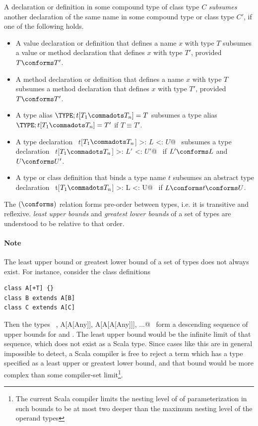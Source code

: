 A declaration or definition in some compound type of class type $C$
{\em subsumes} another
declaration of the same name in some compound type or class type $C'$, if one of the following holds.
\begin{itemize}
\item
A value declaration or definition that defines a name $x$ with type $T$ subsumes 
a value or method declaration that defines $x$ with type $T'$, provided $T \conforms T'$.
\item 
A method declaration or definition that defines a name $x$ with type $T$ subsumes 
a method declaration that defines $x$ with type $T'$, provided $T \conforms T'$.
\item
A type alias
$\TYPE;t[T_1 \commadots T_n]=T$ subsumes a type alias $\TYPE;t[T_1 \commadots T_n]=T'$ if %
$T \equiv T'$. 
\item 
A type declaration ~\lstinline@type $t$[$T_1 \commadots T_n$] >: $L$ <: $U$@~ subsumes %
a type declaration ~\lstinline@type $t$[$T_1 \commadots T_n$] >: $L'$ <: $U'$@~ if $L' \conforms L$ and %
$U \conforms U'$.
\item
A type or class definition that binds a type name $t$ subsumes an abstract
type declaration ~\lstinline@type t[$T_1 \commadots T_n$] >: L <: U@~ if %
$L \conforms t \conforms U$.
\end{itemize}

The $(\conforms)$ relation forms pre-order between types,
i.e. it is transitive and reflexive. {\em
least upper bounds} and {\em greatest lower bounds} of a set of types
are understood to be relative to that order.

\paragraph{Note} The least upper bound or greatest lower bound 
of a set of types does not always exist. For instance, consider
the class definitions
\begin{lstlisting}
class A[+T] {}
class B extends A[B] 
class C extends A[C] 
\end{lstlisting}
Then the types ~\lstinline@A[Any], A[A[Any]], A[A[A[Any]]], ...@~ form
a descending sequence of upper bounds for  and . The
least upper bound would be the infinite limit of that sequence, which
does not exist as a Scala type. Since cases like this are in general
impossible to detect, a Scala compiler is free to reject a term
which has a type specified as a least upper or greatest lower bound,
and that bound would be more complex than some compiler-set
limit\footnote{The current Scala compiler limits the nesting level of
of parameterization in such bounds to be at most two deeper than the maximum
nesting level of the operand types}.

